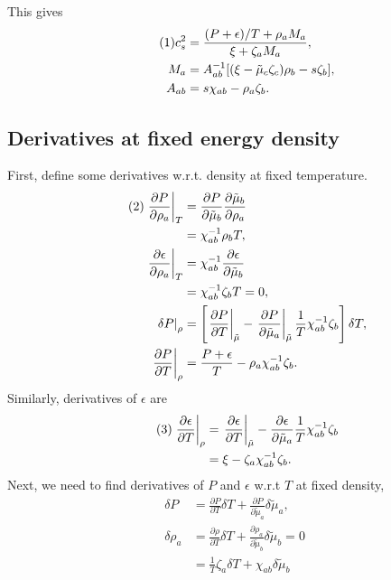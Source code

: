 \documentclass[12pt]{article}
\numberwithin{equation}{section}
\numberwithin{figure}{section}
\newcommand\eqnumber{\addtocounter{equation}{1}\tag{\theequation}}
\begin{document}
This gives
\begin{align*}\eqnumber\label{eq:f12}
c_s^2&=\frac{(P+\epsilon)/T+\rho_a M_a}{\xi+\zeta_aM_a},\\
M_a&=A^{-1}_{ab}[(\xi-\tilde{\mu}_c\zeta_c)\rho_b-s\zeta_b],\\
A_{ab}&=s\chi_{ab}-\rho_a\zeta_b.
\end{align*}

\subsection{Derivatives at fixed energy density}
First, define some derivatives w.r.t. density at fixed temperature.
\begin{align*}\eqnumber\label{eq:dPdrhoT}
\left.\frac{\partial P}{\partial\rho_a}\right|_T&=
\frac{\partial P}{\partial\tilde{\mu}_b}\frac{\partial\tilde{\mu}_b}{\partial\rho_a}\\
&=\chi^{-1}_{ab}\rho_bT,\\
\left.\frac{\partial\epsilon}{\partial\rho_a}\right|_T&=\chi^{-1}_{ab}\frac{\partial\epsilon}{\partial\tilde{\mu}_b}\\
&=\chi^{-1}_{ab}\zeta_bT=0,\\
\left.\delta P\right|_\rho&=\left[\left.\frac{\partial P}{\partial T}\right|_{\tilde{\mu}}
-\left.\frac{\partial P}{\partial\tilde{\mu}_a}\right|_{\tilde{\mu}}\frac{1}{T}\chi^{-1}_{ab}\zeta_b
\right]\delta T,\\
\left.\frac{\partial P}{\partial T}\right|_\rho&=\frac{P+\epsilon}{T}-\rho_a\chi^{-1}_{ab}\zeta_b.
\end{align*}
Similarly, derivatives of $\epsilon$ are
\begin{align*}\eqnumber\label{eq:dedrhoT}
\left.\frac{\partial\epsilon}{\partial T}\right|_\rho&=
\left.\frac{\partial\epsilon}{\partial T}\right|_{\tilde{\mu}}
-\frac{\partial\epsilon}{\partial\tilde{\mu}_a}\frac{1}{T}\chi^{-1}_{ab}\zeta_b\\
&=\xi-\zeta_a\chi^{-1}_{ab}\zeta_b.
\end{align*}
Next, we need to find derivatives of $P$ and $\epsilon$ w.r.t $T$ at fixed density,
\begin{eqnarray}
\delta P&=\frac{\partial P}{\partial T}\delta T+\frac{\partial P}{\partial\tilde{\mu}_a}\delta\tilde{\mu}_a,\\
\delta\rho_a&=\frac{\partial\rho}{\partial T}\delta T+\frac{\partial\rho_a}{\partial\tilde{\mu}_b}\delta\tilde{\mu}_b=0\\
&=\frac{1}{T}\zeta_a\delta T+\chi_{ab}\delta\tilde{\mu}_b
\end{eqnarray}
\end{document}
